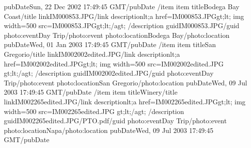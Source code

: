 \documentclass[letterpaper,12pt,english,openany,oneside]{sphinxmanual}
\begin{document}
\begin{sphinxVerbatim}[commandchars=\\\{\}]
           \PYGZlt{}pubDate\PYGZgt{}Sun, 22 Dec 2002 17:49:45 GMT\PYGZlt{}/pubDate\PYGZgt{}
       \PYGZlt{}/item\PYGZgt{}
       \PYGZlt{}item\PYGZgt{}
           \PYGZlt{}title\PYGZgt{}Bodega Bay Coast\PYGZlt{}/title\PYGZgt{}
           \PYGZlt{}link\PYGZgt{}IM000853.JPG\PYGZlt{}/link\PYGZgt{}
           \PYGZlt{}description\PYGZgt{}\PYGZam{}lt;a href=\PYGZdq{}IM000853.JPG\PYGZdq{}\PYGZam{}gt;\PYGZam{}lt;
               img width=500 src=\PYGZdq{}IM000853.JPG\PYGZdq{}\PYGZam{}gt;\PYGZam{}lt;/a\PYGZam{}gt;
           \PYGZlt{}/description\PYGZgt{}
           \PYGZlt{}guid\PYGZgt{}IM000853.JPG\PYGZlt{}/guid\PYGZgt{}
           \PYGZlt{}photo:event\PYGZgt{}Day Trip\PYGZlt{}/photo:event\PYGZgt{}
           \PYGZlt{}photo:location\PYGZgt{}Bodega Bay\PYGZlt{}/photo:location\PYGZgt{}
           \PYGZlt{}pubDate\PYGZgt{}Wed, 01 Jan 2003 17:49:45 GMT\PYGZlt{}/pubDate\PYGZgt{}
       \PYGZlt{}/item\PYGZgt{}
       \PYGZlt{}item\PYGZgt{}
           \PYGZlt{}title\PYGZgt{}San Gregorio\PYGZlt{}/title\PYGZgt{}
           \PYGZlt{}link\PYGZgt{}IM002002\PYGZus{}edited.JPG\PYGZlt{}/link\PYGZgt{}
           \PYGZlt{}description\PYGZgt{}\PYGZam{}lt;a href=\PYGZdq{}IM002002\PYGZus{}edited.JPG\PYGZdq{}\PYGZam{}gt;\PYGZam{}lt;
               img width=500 src=\PYGZdq{}IM002002\PYGZus{}edited.JPG\PYGZdq{}
               \PYGZam{}gt;\PYGZam{}lt;/a\PYGZam{}gt;
           \PYGZlt{}/description\PYGZgt{}
           \PYGZlt{}guid\PYGZgt{}IM002002\PYGZus{}edited.JPG\PYGZlt{}/guid\PYGZgt{}
           \PYGZlt{}photo:event\PYGZgt{}Day Trip\PYGZlt{}/photo:event\PYGZgt{}
           \PYGZlt{}photo:location\PYGZgt{}San Gregorio\PYGZlt{}/photo:location\PYGZgt{}
           \PYGZlt{}pubDate\PYGZgt{}Wed, 09 Jul 2003 17:49:45 GMT\PYGZlt{}/pubDate\PYGZgt{}
       \PYGZlt{}/item\PYGZgt{}
       \PYGZlt{}item\PYGZgt{}
           \PYGZlt{}title\PYGZgt{}Winery\PYGZlt{}/title\PYGZgt{}
           \PYGZlt{}link\PYGZgt{}IM002265\PYGZus{}edited.JPG\PYGZlt{}/link\PYGZgt{}
           \PYGZlt{}description\PYGZgt{}\PYGZam{}lt;a href=\PYGZdq{}IM002265\PYGZus{}edited.JPG\PYGZdq{}\PYGZam{}gt;\PYGZam{}lt;
               img width=500 src=\PYGZdq{}IM002265\PYGZus{}edited.JPG\PYGZdq{}
               \PYGZam{}gt;\PYGZam{}lt;/a\PYGZam{}gt;
           \PYGZlt{}/description\PYGZgt{}
           \PYGZlt{}guid\PYGZgt{}IM002265\PYGZus{}edited.JPG/PTO.pdf\PYGZlt{}/guid\PYGZgt{}
           \PYGZlt{}photo:event\PYGZgt{}Day Trip\PYGZlt{}/photo:event\PYGZgt{}
           \PYGZlt{}photo:location\PYGZgt{}Napa\PYGZlt{}/photo:location\PYGZgt{}
           \PYGZlt{}pubDate\PYGZgt{}Wed, 09 Jul 2003 17:49:45 GMT\PYGZlt{}/pubDate\PYGZgt{}

\end{sphinxVerbatim}
\end{document}
